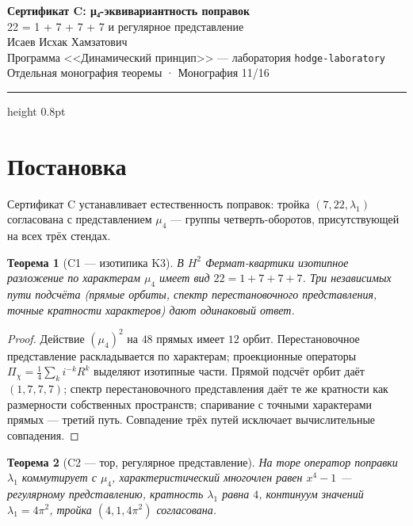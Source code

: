 \documentclass[11pt,a4paper]{article}
\theoremstyle{plain}
\newtheorem{theorem}{Теорема}
\theoremstyle{definition}
\theoremstyle{remark}
\begin{document}
\begin{center}
{\LARGE\bfseries Сертификат C: μ₄-эквивариантность поправок}\\[0.4em]
{\large 22 = 1 + 7 + 7 + 7 и регулярное представление}\\[0.6em]
{\normalsize Исаев Исхак Хамзатович}\\[0.2em]
{\small Программа <<Динамический принцип>> --- лаборатория \texttt{hodge-laboratory}}\\[0.15em]
{\small Отдельная монография теоремы · Монография 11/16}
\end{center}
\vspace{0.4em}
{\color{linkblue}\hrule height 0.8pt}
\vspace{0.8em}

\section{Постановка}

Сертификат C устанавливает естественность поправок: тройка
$(7,22,\lambda_1)$ согласована с представлением $\mu_4$ ---
группы четверть-оборотов, присутствующей на всех трёх стендах.

\begin{theorem}[C1 --- изотипика K3]\label{th:C1stand}
В $H^2$ Фермат-квартики изотипное разложение по характерам $\mu_4$
имеет вид $22=1+7+7+7$. Три независимых пути подсчёта (прямые
орбиты, спектр перестановочного представления, точные кратности
характеров) дают одинаковый ответ.
\end{theorem}

\begin{proof}
Действие $(\mu_4)^2$ на $48$ прямых имеет $12$ орбит.
Перестановочное представление раскладывается по характерам;
проекционные операторы $\Pi_\chi=\frac14\sum_k i^{-k}R^k$
выделяют изотипные части. Прямой подсчёт орбит даёт $(1,7,7,7)$;
спектр перестановочного представления даёт те же кратности как
размерности собственных пространств; спаривание с точными
характерами прямых --- третий путь. Совпадение трёх путей исключает
вычислительные совпадения.
\end{proof}

\begin{theorem}[C2 --- тор, регулярное представление]\label{th:C2stand}
На торе оператор поправки $\lambda_1$ коммутирует с $\mu_4$,
характеристический многочлен равен $x^4-1$ --- регулярному
представлению, кратность $\lambda_1$ равна $4$, континуум значений
$\lambda_1=4\pi^2$, тройка $(4,1,4\pi^2)$ согласована.
\end{theorem}
\end{document}
